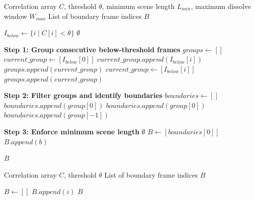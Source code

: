 \documentclass{article}
\begin{document}
\begin{algorithm}
\caption{Threshold-Based Shot Boundary Detection with Constraints}
\begin{algorithmic}[1]
\Require Correlation array $C$, threshold $\theta$, minimum scene length $L_{min}$, maximum dissolve window $W_{max}$
\Ensure List of boundary frame indices $B$

\State $I_{below} \gets \{i \mid C[i] < \theta\}$ 
    \State \Return $\emptyset$
\EndIf

\State \textbf{Step 1: Group consecutive below-threshold frames}
\State $groups \gets []$
\State $current\_group \gets [I_{below}[0]]$
        \State $current\_group.append(I_{below}[i])$
    \Else
        \State $groups.append(current\_group)$
        \State $current\_group \gets [I_{below}[i]]$
    \EndIf
\EndFor
\State $groups.append(current\_group)$

\State \textbf{Step 2: Filter groups and identify boundaries}
\State $boundaries \gets []$
        \State $boundaries.append(group[0])$ 
    \Else
        \State $boundaries.append(group[0])$ 
        \State $boundaries.append(group[-1])$ 
    \EndIf
\EndFor

\State \textbf{Step 3: Enforce minimum scene length}
    \State \Return $\emptyset$
\EndIf
\State $B \gets [boundaries[0]]$
        \State $B.append(b)$
    \EndIf
\EndFor

\State \Return $B$
\end{algorithmic}
\end{algorithm}

\begin{algorithm}
\caption{Simple Threshold-Based Boundary Detection}
\begin{algorithmic}[1]
\Require Correlation array $C$, threshold $\theta$
\Ensure List of boundary frame indices $B$

\State $B \gets []$
        \State $B.append(i)$
    \EndIf
\EndFor
\State \Return $B$
\end{algorithmic}
\end{algorithm}
\end{document}
